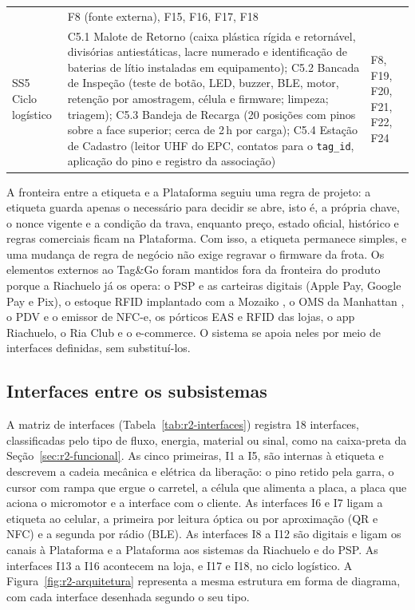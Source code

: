\begin{table}[htbp]
\begin{tabularx}{\textwidth}{@{}
        >{\RaggedRight\arraybackslash}p{2.3cm}
        >{\RaggedRight\arraybackslash}X
        >{\RaggedRight\arraybackslash}p{2.6cm}@{}}
            & F8 (fonte externa), F15, F16, F17, F18 \\
        \addlinespace
        SS5 Ciclo logístico
            & C5.1 Malote de Retorno (caixa plástica rígida e retornável, divisórias antiestáticas, lacre numerado e identificação de baterias de lítio instaladas em equipamento); C5.2 Bancada de Inspeção (teste de botão, LED, buzzer, BLE, motor, retenção por amostragem, célula e firmware; limpeza; triagem); C5.3 Bandeja de Recarga (20 posições com pinos sobre a face superior; cerca de 2\,h por carga); C5.4 Estação de Cadastro (leitor UHF do EPC, contatos para o \texttt{tag\_id}, aplicação do pino e registro da associação)
            & F8, F19, F20, F21, F22, F24 \\
        \bottomrule
    \end{tabularx}
\end{table}

A fronteira entre a etiqueta e a Plataforma seguiu uma regra de projeto: a etiqueta guarda apenas o necessário para decidir se abre, isto é, a própria chave, o nonce vigente e a condição da trava, enquanto preço, estado oficial, histórico e regras comerciais ficam na Plataforma. Com isso, a etiqueta permanece simples, e uma mudança de regra de negócio não exige regravar o firmware da frota. Os elementos externos ao Tag\&Go foram mantidos fora da fronteira do produto porque a Riachuelo já os opera: o PSP e as carteiras digitais (Apple Pay, Google Pay e Pix), o estoque RFID implantado com a Mozaiko \cite{tiinside2022riachuelo}, o OMS da Manhattan \cite{manhattan2026riachuelo}, o PDV e o emissor de NFC-e, os pórticos EAS e RFID das lojas, o app Riachuelo, o Ria Club e o e-commerce. O sistema se apoia neles por meio de interfaces definidas, sem substituí-los.

\subsection{Interfaces entre os subsistemas}

A matriz de interfaces (Tabela~\ref{tab:r2-interfaces}) registra 18 interfaces, classificadas pelo tipo de fluxo, energia, material ou sinal, como na caixa-preta da Seção~\ref{sec:r2-funcional}. As cinco primeiras, I1 a I5, são internas à etiqueta e descrevem a cadeia mecânica e elétrica da liberação: o pino retido pela garra, o cursor com rampa que ergue o carretel, a célula que alimenta a placa, a placa que aciona o micromotor e a interface com o cliente. As interfaces I6 e I7 ligam a etiqueta ao celular, a primeira por leitura óptica ou por aproximação (QR e NFC) e a segunda por rádio (BLE). As interfaces I8 a I12 são digitais e ligam os canais à Plataforma e a Plataforma aos sistemas da Riachuelo e do PSP. As interfaces I13 a I16 acontecem na loja, e I17 e I18, no ciclo logístico. A Figura~\ref{fig:r2-arquitetura} representa a mesma estrutura em forma de diagrama, com cada interface desenhada segundo o seu tipo.

